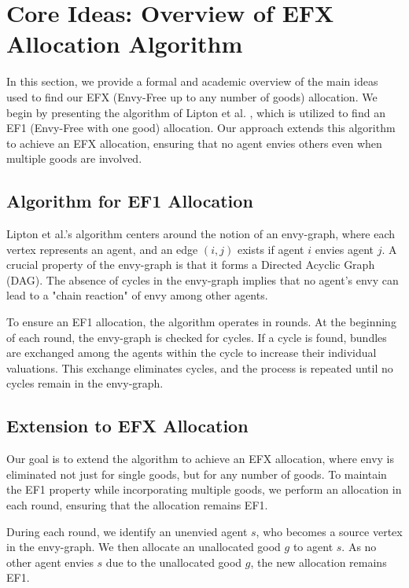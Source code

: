 \documentclass{article}
\begin{document}
\section{Core Ideas: Overview of EFX Allocation Algorithm}

In this section, we provide a formal and academic overview of the main ideas used to find our EFX (Envy-Free up to any number of goods) allocation. We begin by presenting the algorithm of Lipton et al. \cite{10.1145/988772.988792}, which is utilized to find an EF1 (Envy-Free with one good) allocation. Our approach extends this algorithm to achieve an EFX allocation, ensuring that no agent envies others even when multiple goods are involved.

\subsection{Algorithm for EF1 Allocation}

Lipton et al.'s algorithm \cite{10.1145/988772.988792} centers around the notion of an envy-graph, where each vertex represents an agent, and an edge $(i, j)$ exists if agent $i$ envies agent $j$. A crucial property of the envy-graph is that it forms a Directed Acyclic Graph (DAG). The absence of cycles in the envy-graph implies that no agent's envy can lead to a "chain reaction" of envy among other agents.

To ensure an EF1 allocation, the algorithm operates in rounds. At the beginning of each round, the envy-graph is checked for cycles. If a cycle is found, bundles are exchanged among the agents within the cycle to increase their individual valuations. This exchange eliminates cycles, and the process is repeated until no cycles remain in the envy-graph.

\subsection{Extension to EFX Allocation}

Our goal is to extend the algorithm to achieve an EFX allocation, where envy is eliminated not just for single goods, but for any number of goods. To maintain the EF1 property while incorporating multiple goods, we perform an allocation in each round, ensuring that the allocation remains EF1.

During each round, we identify an unenvied agent $s$, who becomes a source vertex in the envy-graph. We then allocate an unallocated good $g$ to agent $s$. As no other agent envies $s$ due to the unallocated good $g$, the new allocation remains EF1.
\end{document}
